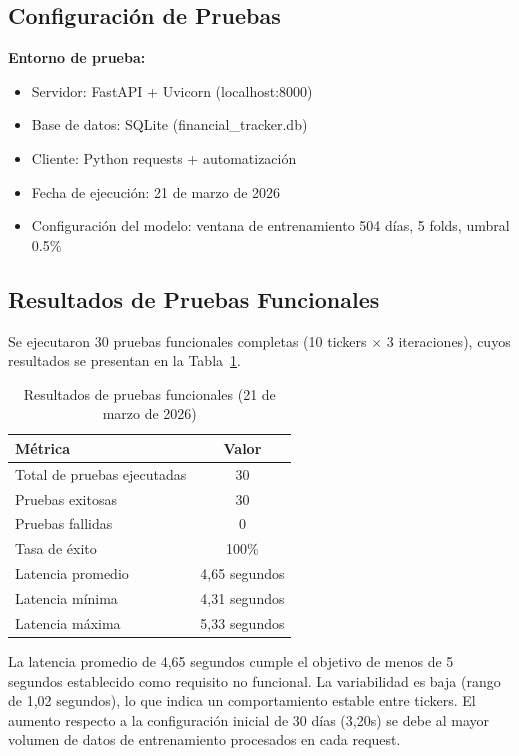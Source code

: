   \subsection{Configuración de Pruebas}

  \textbf{Entorno de prueba:}
  \begin{itemize}
      \item Servidor: FastAPI + Uvicorn (localhost:8000)
      \item Base de datos: SQLite (financial\_tracker.db)
      \item Cliente: Python requests + automatización
      \item Fecha de ejecución: 21 de marzo de 2026
      \item Configuración del modelo: ventana de entrenamiento 504 días, 5 folds, umbral 0.5\%
  \end{itemize}

  \subsection{Resultados de Pruebas Funcionales}

  Se ejecutaron 30 pruebas funcionales completas (10 tickers $\times$ 3 iteraciones),
  cuyos resultados se presentan en la Tabla~\ref{tab:pruebas-funcionales}.

  \begin{table}[H]
  \centering
  \caption{Resultados de pruebas funcionales (21 de marzo de 2026)}
  \label{tab:pruebas-funcionales}
  \begin{tabular}{lc}
  \toprule
  \textbf{Métrica} & \textbf{Valor} \\
  \midrule
  Total de pruebas ejecutadas & 30 \\
  Pruebas exitosas & 30 \\
  Pruebas fallidas & 0 \\
  Tasa de éxito & 100\% \\
  Latencia promedio & 4{,}65 segundos \\
  Latencia mínima & 4{,}31 segundos \\
  Latencia máxima & 5{,}33 segundos \\
  \bottomrule
  \end{tabular}
  \end{table}

  La latencia promedio de 4{,}65 segundos cumple el objetivo de menos de 5 segundos establecido
  como requisito no funcional. La variabilidad es baja (rango de 1{,}02 segundos), lo que
  indica un comportamiento estable entre tickers. El aumento respecto a la configuración inicial
  de 30 días (3{,}20s) se debe al mayor volumen de datos de entrenamiento procesados en cada
  request.

